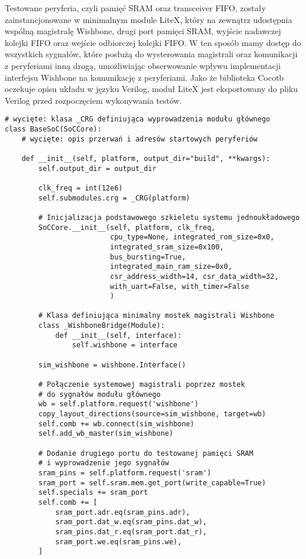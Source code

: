 
Testowane peryferia, czyli pamięć SRAM oraz transceiver FIFO, zostały zainstancjonowane w minimalnym module LiteX, który na zewnątrz udostępnia wspólną magistralę Wishbone, drugi port pamięci SRAM, wyjście nadawczej kolejki FIFO oraz wejście odbiorczej kolejki FIFO. W ten sposób mamy dostęp do wszystkich sygnałów, które posłużą do wysterowania magistrali oraz komunikacji z peryferiami inną drogą, umożliwiając obserwowanie wpływu implementacji interfejsu Wishbone na komunikację z peryferiami. Jako że biblioteka Cocotb oczekuje opisu układu w języku Verilog, moduł LiteX jest eksportowany do pliku Verilog przed rozpoczęciem wykonywania testów.

\begin{longlisting}
\begin{verbatim}
# wycięte: klasa _CRG definiująca wyprowadzenia modułu głównego
class BaseSoC(SoCCore):
    # wycięte: opis przerwań i adresów startowych peryferiów

    def __init__(self, platform, output_dir="build", **kwargs):
        self.output_dir = output_dir

        clk_freq = int(12e6)
        self.submodules.crg = _CRG(platform)

        # Inicjalizacja podstawowego szkieletu systemu jednoukładowego
        SoCCore.__init__(self, platform, clk_freq,
                         cpu_type=None, integrated_rom_size=0x0,
                         integrated_sram_size=0x100,
                         bus_bursting=True,
                         integrated_main_ram_size=0x0,
                         csr_address_width=14, csr_data_width=32,
                         with_uart=False, with_timer=False
                         )

        # Klasa definiująca minimalny mostek magistrali Wishbone
        class _WishboneBridge(Module):
            def __init__(self, interface):
                self.wishbone = interface

        sim_wishbone = wishbone.Interface()

        # Połączenie systemowej magistrali poprzez mostek
        # do sygnałów modułu głównego
        wb = self.platform.request('wishbone')
        copy_layout_directions(source=sim_wishbone, target=wb)
        self.comb += wb.connect(sim_wishbone)
        self.add_wb_master(sim_wishbone)

        # Dodanie drugiego portu do testowanej pamięci SRAM
        # i wyprowadzenie jego sygnałów
        sram_pins = self.platform.request('sram')
        sram_port = self.sram.mem.get_port(write_capable=True)
        self.specials += sram_port
        self.comb += [
            sram_port.adr.eq(sram_pins.adr),
            sram_port.dat_w.eq(sram_pins.dat_w),
            sram_pins.dat_r.eq(sram_port.dat_r),
            sram_port.we.eq(sram_pins.we),
        ]


\end{verbatim}
\end{longlisting}
